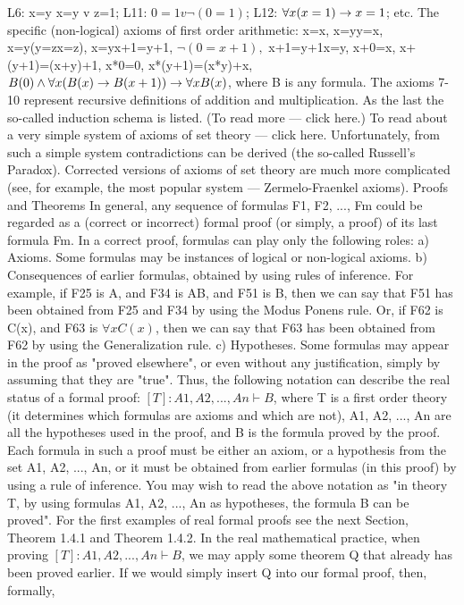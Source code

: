 L6: x=y \IMPLIES  x=y v z=1;
L11: \(0=1 v \neg (0=1)\);
L12: \(\forall x(x=1) \rightarrow  x=1\);
etc.
The specific (non-logical) axioms of first order arithmetic:
x=x,
x=y\IMPLIES y=x,
x=y\IMPLIES (y=z\IMPLIES x=z),
x=y\IMPLIES x+1=y+1,
\(\neg (0=x+1),\)
x+1=y+1\IMPLIES x=y,
x+0=x,
x+(y+1)=(x+y)+1,
x*0=0,
x*(y+1)=(x*y)+x,
\(B(0) \wedge  \forall x(B(x)\rightarrow B(x+1))\rightarrow \forall xB(x)\), where B is any formula.
The axioms 7-10 represent recursive definitions of addition and multiplication. As the last the so-called induction schema is
listed. (To read more --- click here.)
To read about a very simple system of axioms of set theory --- click here. Unfortunately, from such a simple system
contradictions can be derived (the so-called Russell's Paradox). Corrected versions of axioms of set theory are much more
complicated (see, for example, the most popular system --- Zermelo-Fraenkel axioms).
Proofs and Theorems
In general, any sequence of formulas F1, F2, ..., Fm could be regarded as a (correct or incorrect) formal
proof (or simply, a proof) of its last formula Fm. In a correct proof, formulas can play only the following
roles:
a) Axioms. Some formulas may be instances of logical or non-logical axioms.
b) Consequences of earlier formulas, obtained by using rules of inference. For example, if F25 is A, and
F34 is A\IMPLIES B, and F51 is B, then we can say that F51 has been obtained from F25 and F34 by using the
Modus Ponens rule. Or, if F62 is C(x), and F63 is \(\forall xC(x)\), then we can say that F63 has been obtained
from F62 by using the Generalization rule.
c) Hypotheses. Some formulas may appear in the proof as "proved elsewhere", or even without any
justification, simply by assuming that they are "true".
Thus, the following notation can describe the real status of a formal proof:
\([T]: A1, A2, ..., An \vdash B\),
where T is a first order theory (it determines which formulas are axioms and which are not), A1, A2, ..., An
are all the hypotheses used in the proof, and B is the formula proved by the proof. Each formula in such a
proof must be either an axiom, or a hypothesis from the set A1, A2, ..., An, or it must be obtained from
earlier formulas (in this proof) by using a rule of inference. You may wish to read the above notation as
"in theory T, by using formulas A1, A2, ..., An as hypotheses, the formula B can be proved".
For the first examples of real formal proofs see the next Section, Theorem 1.4.1 and Theorem 1.4.2.
In the real mathematical practice, when proving \([T]: A1, A2, ..., An \vdash B\), we may apply some theorem Q
that already has been proved earlier. If we would simply insert Q into our formal proof, then, formally,
